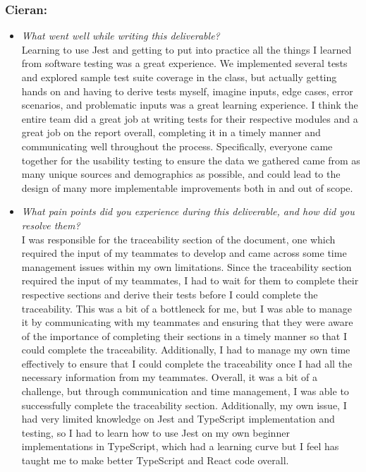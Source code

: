 \documentclass[12pt, titlepage]{article}
\begin{document}
\subsubsection*{Cieran:}
\begin{itemize}
  \item \textit{What went well while writing this deliverable?} \\
  Learning to use Jest and getting to put into practice all the things I learned from software testing was a great experience. We implemented several tests and explored sample test suite coverage in the class, but actually getting hands on and having to derive tests myself, imagine inputs, edge cases, error scenarios, and problematic inputs was a great learning experience. I think the entire team did a great job at writing tests for their respective modules and a great job on the report overall, completing it in a timely manner and communicating well throughout the process. Specifically, everyone came together for the usability testing to ensure the data we gathered came from as many unique sources and demographics as possible, and could lead to the design of many more implementable improvements both in and out of scope.
    
  \item \textit{What pain points did you experience during this deliverable, and how did you resolve them?}\\
  I was responsible for the traceability section of the document, one which required the input of my teammates to develop and came across some time management issues within my own limitations. Since the traceability section required the input of my teammates, I had to wait for them to complete their respective sections and derive their tests before I could complete the traceability. This was a bit of a bottleneck for me, but I was able to manage it by communicating with my teammates and ensuring that they were aware of the importance of completing their sections in a timely manner so that I could complete the traceability. Additionally, I had to manage my own time effectively to ensure that I could complete the traceability once I had all the necessary information from my teammates. Overall, it was a bit of a challenge, but through communication and time management, I was able to successfully complete the traceability section. Additionally, my own issue, I had very limited knowledge on Jest and TypeScript implementation and testing, so I had to learn how to use Jest on my own beginner implementations in TypeScript, which had a learning curve but I feel has taught me to make better TypeScript and React code overall.
    
\end{itemize}
\end{document}
